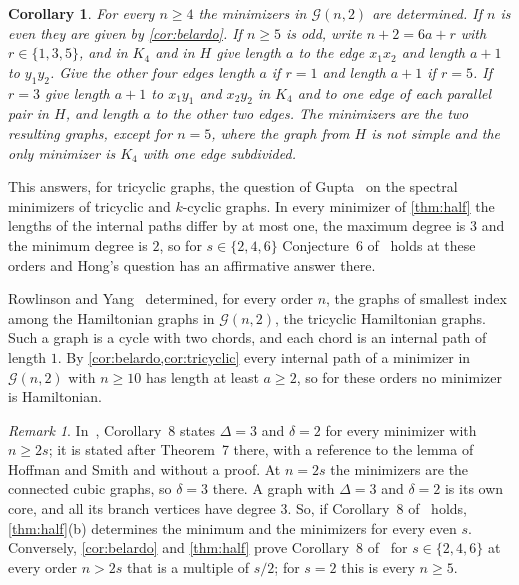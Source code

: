 \documentclass[11pt]{article}
\newtheorem{corollary}[theorem]{Corollary}
\theoremstyle{definition}
\theoremstyle{remark}
\newtheorem{remark}[theorem]{Remark}
\newcommand{\G}{\mathcal{G}}
\begin{document}
\begin{corollary}\label{cor:tricyclic}
For every $n\ge4$ the minimizers in $\G(n,2)$ are determined. If $n$ is even they are given by \cref{cor:belardo}. If
$n\ge5$ is odd, write $n+2=6a+r$ with $r\in\{1,3,5\}$, and in $K_4$ and in $H$ give length $a$ to the edge $x_1x_2$
and length $a+1$ to $y_1y_2$. Give the other four edges length $a$ if $r=1$ and length $a+1$ if $r=5$. If $r=3$ give
length $a+1$ to $x_1y_1$ and $x_2y_2$ in $K_4$ and to one edge of each parallel pair in $H$, and length $a$ to the other
two edges. The minimizers are the two resulting graphs, except for $n=5$, where the graph from $H$ is not simple and the
only minimizer is $K_4$ with one edge subdivided.
\end{corollary}

This answers, for tricyclic graphs, the question of Gupta~\cite[slide~21]{Gu24} on the spectral minimizers of
tricyclic and $k$-cyclic graphs. In every minimizer of \cref{thm:half} the lengths of the internal paths differ by at
most one, the maximum degree is $3$ and the minimum degree is $2$, so for $s\in\{2,4,6\}$ Conjecture~6 of~\cite{Be19}
holds at these orders and Hong's question has an affirmative answer there.

Rowlinson and Yang~\cite{RY93} determined, for every order $n$, the graphs of smallest index among the Hamiltonian
graphs in $\G(n,2)$, the tricyclic Hamiltonian graphs. Such a graph is a cycle with two chords, and each chord is an
internal path of length $1$. By \cref{cor:belardo,cor:tricyclic} every internal path of a minimizer in $\G(n,2)$ with
$n\ge10$ has length at least $a\ge2$, so for these orders no minimizer is Hamiltonian.

\begin{remark}\label{rem:cor8}
In~\cite{Be19}, Corollary~8 states $\Delta=3$ and $\delta=2$ for every minimizer with $n\ge2s$; it is stated after
Theorem~7 there, with a reference to the lemma of Hoffman and Smith and without a proof. At $n=2s$ the minimizers are
the connected cubic graphs, so $\delta=3$ there. A graph with $\Delta=3$ and $\delta=2$
is its own core, and all its branch vertices have degree $3$. So, if
Corollary~8 of~\cite{Be19} holds, \cref{thm:half}(b) determines the minimum and the minimizers for every even $s$. Conversely,
\cref{cor:belardo} and \cref{thm:half} prove Corollary~8 of~\cite{Be19} for $s\in\{2,4,6\}$ at every order $n>2s$ that is a multiple
of $s/2$; for $s=2$ this is every $n\ge5$.
\end{remark}
\end{document}
